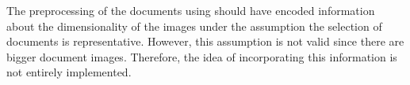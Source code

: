 The preprocessing of the documents using \eigendocs{} should have encoded information about the dimensionality of the images 
under the assumption the selection of documents is representative.
However, this assumption is not valid since there are bigger document images.
Therefore, the idea of incorporating this information is not entirely implemented.